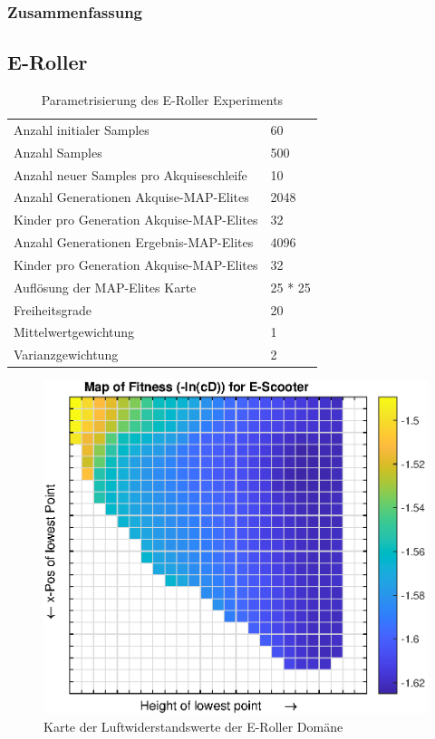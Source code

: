\subsubsection{Zusammenfassung}


\subsection{E-Roller}

\begin{table}[h]
	\centering
	\begin{tabularx}{.75\textwidth}{ll}\hline
		Anzahl initialer Samples & 60 \\
		Anzahl Samples & 500 \\
		Anzahl neuer Samples pro Akquiseschleife & 10 \\
		Anzahl Generationen Akquise-MAP-Elites & 2048 \\
		Kinder pro Generation Akquise-MAP-Elites & 32 \\
		Anzahl Generationen Ergebnis-MAP-Elites & 4096 \\
		Kinder pro Generation Akquise-MAP-Elites & 32 \\
		Auflösung der MAP-Elites Karte & 25 * 25  \\
		\hline
		Freiheitsgrade & 20 \\
		Mittelwertgewichtung & 1 \\
		Varianzgewichtung & 2 \\
	\end{tabularx}
	\label{tab:parmasEscooter}
	\caption{Parametrisierung des E-Roller Experiments}
\end{table}



\begin{figure}[h]
	\centering
	\includegraphics[width=.7\linewidth]{bilder/escooter/dragMapEscooter}
	\caption{Karte der Luftwiderstandswerte der E-Roller Domäne}
	\label{fig:dragMapEscooter}
\end{figure}

